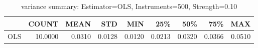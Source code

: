 \begin{table}[ht]
\centering
\caption{variance summary: Estimator=OLS, Instruments=500, Strength=0.10}
\begin{tabular}{lrrrrrrrr}
\toprule
 & COUNT & MEAN & STD & MIN & 25\% & 50\% & 75\% & MAX \\
\midrule
OLS & 10.0000 & 0.0310 & 0.0128 & 0.0120 & 0.0213 & 0.0320 & 0.0366 & 0.0510 \\
\bottomrule
\end{tabular}
\end{table}
